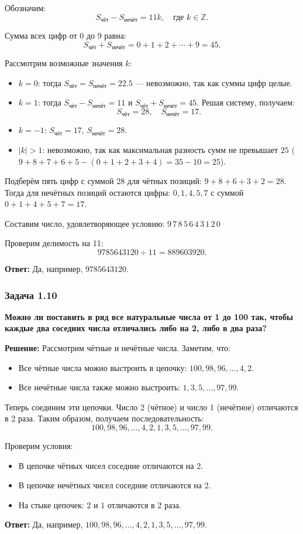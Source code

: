 \documentclass[12pt, a4paper]{article}
\begin{document}
Обозначим:
\[
S_{\text{чёт}} - S_{\text{нечёт}} = 11k,\quad \text{где } k \in \mathbb{Z}.
\]

Сумма всех цифр от 0 до 9 равна:
\[
S_{\text{чёт}} + S_{\text{нечёт}} = 0 + 1 + 2 + \cdots + 9 = 45.
\]

Рассмотрим возможные значения $k$:
\begin{itemize}
    \item $k = 0$: тогда $S_{\text{чёт}} = S_{\text{нечёт}} = 22.5$ — невозможно, так как суммы цифр целые.
    \item $k = 1$: тогда $S_{\text{чёт}} - S_{\text{нечёт}} = 11$ и $S_{\text{чёт}} + S_{\text{нечёт}} = 45$. Решая систему, получаем:
    \[
    S_{\text{чёт}} = 28,\quad S_{\text{нечёт}} = 17.
    \]
    \item $k = -1$: $S_{\text{чёт}} = 17$, $S_{\text{нечёт}} = 28$.
    \item $|k| > 1$: невозможно, так как максимальная разность сумм не превышает $25$ ($9+8+7+6+5 - (0+1+2+3+4) = 35-10=25$).
\end{itemize}

Подберём пять цифр с суммой 28 для чётных позиций: $9 + 8 + 6 + 3 + 2 = 28$. Тогда для нечётных позиций остаются цифры: $0, 1, 4, 5, 7$ с суммой $0+1+4+5+7=17$.

Составим число, удовлетворяющее условию: $9\,7\,8\,5\,6\,4\,3\,1\,2\,0$ 

Проверим делимость на 11:
\[
9785643120 \div 11 = 889603920.
\]

\textbf{Ответ:} Да, например, $9785643120$.

\subsubsection*{Задача 1.10}
\textbf{Можно ли поставить в ряд все натуральные числа от 1 до 100 так, чтобы каждые два соседних числа отличались либо на 2, либо в два раза?}

\textbf{Решение:}
Рассмотрим чётные и нечётные числа. Заметим, что:
\begin{itemize}
    \item Все чётные числа можно выстроить в цепочку: $100, 98, 96, \ldots, 4, 2$.
    \item Все нечётные числа также можно выстроить: $1, 3, 5, \ldots, 97, 99$.
\end{itemize}

Теперь соединим эти цепочки. Число 2 (чётное) и число 1 (нечётное) отличаются в 2 раза. Таким образом, получаем последовательность:
\[
100, 98, 96, \ldots, 4, 2, 1, 3, 5, \ldots, 97, 99.
\]

Проверим условия:
\begin{itemize}
    \item В цепочке чётных чисел соседние отличаются на 2.
    \item В цепочке нечётных чисел соседние отличаются на 2.
    \item На стыке цепочек: $2$ и $1$ отличаются в 2 раза.
\end{itemize}

\textbf{Ответ:} Да, например, $100, 98, 96, \ldots, 4, 2, 1, 3, 5, \ldots, 97, 99$.
\end{document}
